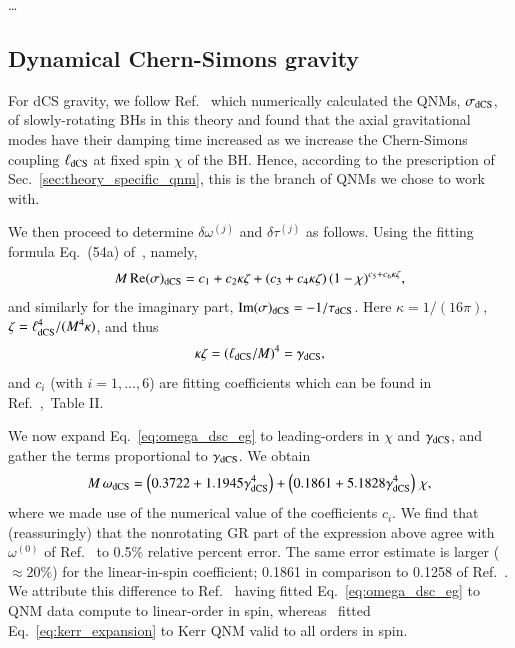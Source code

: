 \documentclass[twocolumn,
               prd,
               aps,
               superscriptaddress,
               tightenlines,
               nofootinbib,
               eqsecnum,
               amsfonts,
               amsmath,
               longbibliography]{revtex4-1}
\begin{document}
\dots


\subsection{Dynamical Chern-Simons gravity}
\label{app:map_dcs}

For dCS gravity, we follow Ref.~\cite{Wagle:2021tam} which numerically calculated the QNMs, $\sigma_{\rm dCS}$,
of slowly-rotating BHs in this theory and found that the axial gravitational modes have their damping time increased as we
increase the Chern-Simons coupling $\ell_{\rm dCS}$ at fixed spin $\chi$ of the BH.
%
Hence, according to the prescription of Sec.~\ref{sec:theory_specific_qnm},
this is the branch of QNMs we chose to work with.

We then proceed to determine $\delta\omega^{(j)}$ and $\delta\tau^{(j)}$ as follows.
%
Using the fitting formula Eq.~(54a) of~\cite{Wagle:2021tam}, namely,
%
\begin{equation}
    M \, {\rm Re}(\sigma)_{\rm dCS} = c_{1} + c_{2} \kappa \zeta + (c_{3} + c_{4} \kappa \zeta) \, (1 - \chi)^{c_{5} + c_{6} \kappa \zeta},
    \label{eq:omega_dsc_eg}
\end{equation}
%
and similarly for the imaginary part, ${\rm Im}(\sigma)_{\rm dCS} =  - 1 / \tau_{\rm dCS}$.
%
Here $\kappa = 1/(16 \pi)$, $\zeta = \ell_{\rm dCS}^{4} / (M^4 \kappa)$, and thus
%
\begin{equation}
    \kappa \zeta = (\ell_{\rm dCS} / M)^4 = \gamma_{\rm dCS},
\end{equation}
%
and $c_{i}$ (with $i=1, \dots, 6$) are fitting coefficients which can be found in
Ref.~\cite{Wagle:2021tam},~Table II.

We now expand Eq.~\eqref{eq:omega_dsc_eg} to leading-orders in $\chi$ and $\gamma_{\rm dCS}$, and
gather the terms proportional to $\gamma_{\rm dCS}$.
%
We obtain
%
\begin{align}
    M \, \omega_{\rm dCS} =
    \left( 0.3722 + 1.1945 \gamma_{\rm dCS}^4 \right)
    + \left(0.1861 + 5.1828 \gamma_{\rm dCS}^4 \right) \, \chi,
    \nonumber \\
    \label{eq:omega_dcs_interm}
\end{align}
%
where we made use of the numerical value of the coefficients $c_{i}$.
%
We find that (reassuringly) that the nonrotating GR part of the expression above agree with $\omega^{(0)}$ of Ref.~\cite{Maselli:2019mjd}
to 0.5\% relative percent error. The same error estimate is larger ($\approx 20$\%) for the linear-in-spin coefficient;
0.1861 in comparison to 0.1258 of Ref.~\cite{Maselli:2019mjd}.
%
We attribute this difference to Ref.~\cite{Wagle:2021tam} having fitted Eq.~\eqref{eq:omega_dsc_eg} to QNM data compute to linear-order in spin, whereas~\cite{Maselli:2019mjd}
fitted Eq.~\eqref{eq:kerr_expansion} to Kerr QNM valid to all orders in spin.
\end{document}
